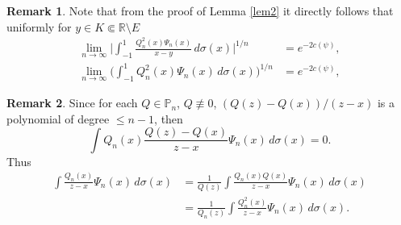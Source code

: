 \documentclass[11pt, a4paper, twoside]{article}
\let\leq\leqslant
\def\RR{\mathbb R}
\def\PP{\mathbb P}
\theoremstyle{plain}
\theoremstyle{definition}
\newtheorem{remark}{Remark}
\begin{document}
\begin{remark}\label{rem24}
Note that from the proof of Lemma \ref{lem2} it directly follows that uniformly for $y\in K\Subset\RR\setminus{E}$
\begin{align}
\lim_{n\to\infty}
\biggl|
\int_{-1}^1\frac{Q_n^2(x)\Psi_n(x)}{x-y}\,d\sigma(x)
\biggr|^{1/n}&=e^{-2c(\psi)},
\label{firstcoefy}\\
\lim_{n\to\infty}\biggl(
\int_{-1}^1 Q_n^2(x)\Psi_n(x)\,d\sigma(x)
\biggr)^{1/n}&=e^{-2c(\psi)},
\label{firstcoef}
\end{align}
\end{remark}

\begin{remark}\label{rem25}
Since  for each $Q\in\PP_n$, $Q\not\equiv0$,
$(Q(z)-Q(x))/(z-x)$ is a polynomial of degree $\leq{n-1}$, then
$$
\int Q_n(x)\frac{Q(z)-Q(x)}{z-x}\Psi_n(x)
\,d\sigma(x)=0.
$$
Thus
\begin{align}
\int \frac{Q_n(x)}{z-x}\Psi_n(x)\,d\sigma(x)
&=\frac1{Q(z)}\int \frac{Q_n(x)Q(x)}{z-x}\Psi_n(x)\,d\sigma(x)\nonumber\\
&=\frac1{Q_n(z)}\int \frac{Q^2_n(x)}{z-x}\Psi_n(x)\,d\sigma(x).\label{relQint}
\end{align}
\end{remark}
\end{document}
